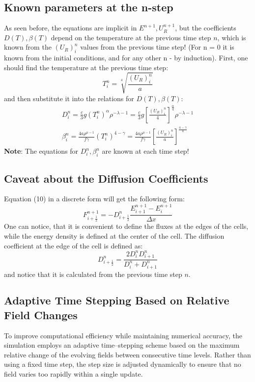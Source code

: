 \documentclass{article}
\begin{document}
\subsection{Known parameters at the n-step}
As seen before, the equations are implicit in $E^{n+1},U_R^{n+1}$, but the coefficients $D(T),\beta(T)$ depend on the temperature at the previous time step $n$,
which is known from the $(U_R)^n_i$ values from the previous time step! (For n = 0 it is known from the initial conditions, and for any other n - by induction).
First, one should find the temperature at the previous time step:
\begin{equation}
    T^n_i=\sqrt[4]{\frac{(U_R)^n_i}{a}}
\end{equation}
and then substitute it into the relations for $D(T),\beta(T)$:
\begin{gather}
    D_i^n=\frac{c}{3}g(T^n_i)^\alpha \rho^{-\lambda - 1}=\frac{c}{3}g\left[\frac{(U_R)^n_i}{4}\right]^\frac{\alpha}{4} \rho^{-\lambda - 1} \\
    \beta_i^n=\frac{4a\rho^{\mu-1}}{f\gamma }(T^n_i)^{4-\gamma}=\frac{4a\rho^{\mu-1}}{f\gamma }\left[\frac{(U_R)^n_i}{a}\right]^\frac{4-\gamma}{4}
\end{gather}
\textbf{Note}: The equations for $D_i^n, \beta_i^n$ are known at each time step!
\subsection{Caveat about the Diffusion Coefficients}
Equation (10) in a discrete form will get the following form:
\begin{equation}
    F_{i+\frac{1}{2}}^{n+1} = - D_{i+\frac{1}{2}}^{n}\frac{E_{i+1}^{n+1} - E_i^{n+1}}{\Delta x}
\end{equation}
One can notice, that it is convenient to define the fluxes at the edges of the cells, 
while the energy density is defined at the center of the cell. 
The diffusion coefficient at the edge of the cell is defined as:
\begin{equation}
    D_{i+\frac{1}{2}}^{n} = \frac{2D_i^{n} D_{i+1}^{n}}{D_i^{n} + D_{i+1}^{n}}
\end{equation}
and notice that it is calculated from the previous time step $n$.

\subsection{Adaptive Time Stepping Based on Relative Field Changes}

To improve computational efficiency while maintaining numerical accuracy, the simulation employs an adaptive time–stepping scheme based on the maximum relative change of the evolving fields between consecutive time levels. Rather than using a fixed time step, the step size is adjusted dynamically to ensure that no field varies too rapidly within a single update.
\end{document}
